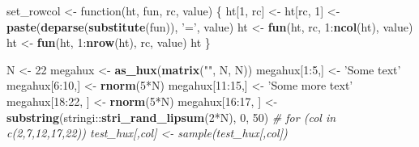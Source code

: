 \documentclass[]{article}
\newenvironment{Shaded}{\begin{snugshade}}{\end{snugshade}}
\newcommand{\KeywordTok}[1]{\textcolor[rgb]{0.13,0.29,0.53}{\textbf{{#1}}}}
\newcommand{\DecValTok}[1]{\textcolor[rgb]{0.00,0.00,0.81}{{#1}}}
\newcommand{\StringTok}[1]{\textcolor[rgb]{0.31,0.60,0.02}{{#1}}}
\newcommand{\CommentTok}[1]{\textcolor[rgb]{0.56,0.35,0.01}{\textit{{#1}}}}
\newcommand{\NormalTok}[1]{{#1}}
\begin{document}
\begin{Shaded}
\begin{Highlighting}[]
\NormalTok{set_rowcol <-}\StringTok{ }\NormalTok{function(ht, fun, rc, value) \{}
  \NormalTok{ht[}\DecValTok{1}\NormalTok{, rc] <-}\StringTok{ }\NormalTok{ht[rc, }\DecValTok{1}\NormalTok{] <-}\StringTok{ }\KeywordTok{paste}\NormalTok{(}\KeywordTok{deparse}\NormalTok{(}\KeywordTok{substitute}\NormalTok{(fun)), }\StringTok{'='}\NormalTok{, value)}
  \NormalTok{ht <-}\StringTok{ }\KeywordTok{fun}\NormalTok{(ht, rc, }\DecValTok{1}\NormalTok{:}\KeywordTok{ncol}\NormalTok{(ht), value)}
  \NormalTok{ht <-}\StringTok{ }\KeywordTok{fun}\NormalTok{(ht, }\DecValTok{1}\NormalTok{:}\KeywordTok{nrow}\NormalTok{(ht), rc, value)}
  \NormalTok{ht}
\NormalTok{\}}

\NormalTok{N <-}\StringTok{ }\DecValTok{22}
\NormalTok{megahux <-}\StringTok{ }\KeywordTok{as_hux}\NormalTok{(}\KeywordTok{matrix}\NormalTok{(}\StringTok{""}\NormalTok{, N, N))}
\NormalTok{megahux[}\DecValTok{1}\NormalTok{:}\DecValTok{5}\NormalTok{,] <-}\StringTok{ 'Some text'}
\NormalTok{megahux[}\DecValTok{6}\NormalTok{:}\DecValTok{10}\NormalTok{,] <-}\StringTok{ }\KeywordTok{rnorm}\NormalTok{(}\DecValTok{5}\NormalTok{*N)}
\NormalTok{megahux[}\DecValTok{11}\NormalTok{:}\DecValTok{15}\NormalTok{,] <-}\StringTok{ 'Some more text'}
\NormalTok{megahux[}\DecValTok{18}\NormalTok{:}\DecValTok{22}\NormalTok{, ] <-}\StringTok{ }\KeywordTok{rnorm}\NormalTok{(}\DecValTok{5}\NormalTok{*N)}
\NormalTok{megahux[}\DecValTok{16}\NormalTok{:}\DecValTok{17}\NormalTok{, ] <-}\StringTok{ }\KeywordTok{substring}\NormalTok{(stringi::}\KeywordTok{stri_rand_lipsum}\NormalTok{(}\DecValTok{2}\NormalTok{*N), }\DecValTok{0}\NormalTok{, }\DecValTok{50}\NormalTok{)}
\CommentTok{# for (col in c(2,7,12,17,22)) test_hux[,col] <- sample(test_hux[,col])}



\end{Highlighting}
\end{Shaded}
\end{document}
